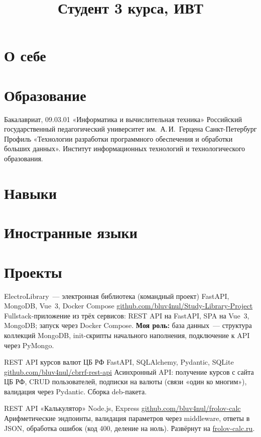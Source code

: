 \documentclass[11pt,a4paper,sans]{moderncv}
\title{Студент 3 курса, ИВТ}
\begin{document}
\makecvtitle

\section{О себе}

\section{Образование}
  {Бакалавриат, 09.03.01 «Информатика и вычислительная техника»}
  {Российский государственный педагогический университет им.~А.\,И.~Герцена}
  {Санкт-Петербург}
  {}
  {Профиль «Технологии разработки программного обеспечения и обработки больших данных».
   Институт информационных технологий и технологического образования.}

\section{Навыки}

\section{Иностранные языки}

\section{Проекты}
\cventry{}
  {ElectroLibrary~--- электронная библиотека (командный проект)}
  {FastAPI, MongoDB, Vue~3, Docker Compose}
  {\href{https://github.com/bluv4nul/Study-Library-Project}{github.com/bluv4nul/Study-Library-Project}}
  {}
  {Fullstack-приложение из трёх сервисов: REST API на FastAPI, SPA на Vue~3,
   MongoDB; запуск через Docker Compose.
   \textbf{Моя роль:} база данных~--- структура коллекций MongoDB,
   init-скрипты начального наполнения, подключение к API через PyMongo.}

\cventry{}
  {REST API курсов валют ЦБ РФ}
  {FastAPI, SQLAlchemy, Pydantic, SQLite}
  {\href{https://github.com/bluv4nul/cbrrf-rest-api}{github.com/bluv4nul/cbrrf-rest-api}}
  {}
  {Асинхронный API: получение курсов с сайта ЦБ РФ, CRUD пользователей,
   подписки на валюты (связи «один ко многим»), валидация через Pydantic.
   Сборка deb-пакета.}

\cventry{}
  {REST API «Калькулятор»}
  {Node.js, Express}
  {\href{https://github.com/bluv4nul/frolov-calc}{github.com/bluv4nul/frolov-calc}}
  {}
  {Арифметические эндпоинты, валидация параметров через middleware,
   ответы в JSON, обработка ошибок (код 400, деление на ноль).
   Развёрнут на \href{https://frolov-calc.ru}{frolov-calc.ru}.}
\end{document}
